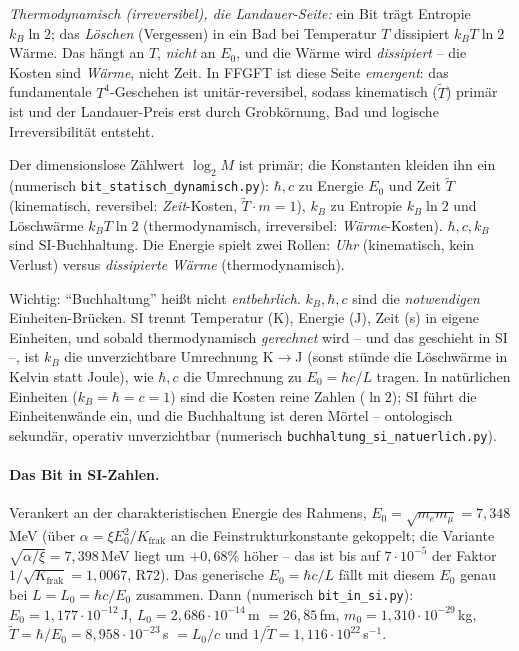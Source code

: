 \emph{Thermodynamisch (irreversibel), die Landauer-Seite:} ein Bit trägt Entropie $k_B\ln 2$; das
\emph{Löschen} (Vergessen) in ein Bad bei Temperatur $T$ dissipiert $k_B T\ln 2$ Wärme. Das hängt an $T$,
\emph{nicht} an $E_0$, und die Wärme wird \emph{dissipiert} -- die Kosten sind \emph{Wärme}, nicht Zeit.
In FFGFT ist diese Seite \emph{emergent}: das fundamentale $T^4$-Geschehen ist unitär-reversibel, sodass
kinematisch ($\tilde T$) primär ist und der Landauer-Preis erst durch Grobkörnung, Bad und logische
Irreversibilität entsteht.

Der dimensionslose Zählwert $\log_2 M$ ist primär; die Konstanten kleiden ihn ein (numerisch
\texttt{bit\_statisch\_dynamisch.py}): $\hbar,c$ zu Energie $E_0$ und Zeit $\tilde T$ (kinematisch,
reversibel: \emph{Zeit}-Kosten, $\tilde T\cdot m=1$), $k_B$ zu Entropie $k_B\ln 2$ und Löschwärme
$k_B T\ln 2$ (thermodynamisch, irreversibel: \emph{Wärme}-Kosten). $\hbar,c,k_B$ sind SI-Buchhaltung.
Die Energie spielt zwei Rollen: \emph{Uhr} (kinematisch, kein Verlust) versus \emph{dissipierte Wärme}
(thermodynamisch).

Wichtig: \enquote{Buchhaltung} heißt nicht \emph{entbehrlich}. $k_B,\hbar,c$ sind die \emph{notwendigen}
Einheiten-Brücken. SI trennt Temperatur (K), Energie (J), Zeit (s) in eigene Einheiten, und sobald
thermodynamisch \emph{gerechnet} wird -- und das geschieht in SI --, ist $k_B$ die unverzichtbare
Umrechnung K$\to$J (sonst stünde die Löschwärme in Kelvin statt Joule), wie $\hbar,c$ die Umrechnung zu
$E_0=\hbar c/L$ tragen. In natürlichen Einheiten ($k_B=\hbar=c=1$) sind die Kosten reine Zahlen ($\ln 2$);
SI führt die Einheitenwände ein, und die Buchhaltung ist deren Mörtel -- ontologisch sekundär, operativ
unverzichtbar (numerisch \texttt{buchhaltung\_si\_natuerlich.py}).

\paragraph{Das Bit in SI-Zahlen.} Verankert an der charakteristischen Energie des Rahmens,
$E_0=\sqrt{m_e m_\mu}=7{,}348$\,MeV (über $\alpha=\xi E_0^2/K_{\text{frak}}$ an die Feinstrukturkonstante gekoppelt; die
Variante $\sqrt{\alpha/\xi}=7{,}398$\,MeV liegt um $+0{,}68\%$ höher -- das ist bis auf $7\cdot10^{-5}$ der Faktor $1/\sqrt{K_{\text{frak}}} = 1{,}0067$, R72). Das
generische $E_0=\hbar c/L$ fällt mit diesem $E_0$ genau bei $L=L_0=\hbar c/E_0$ zusammen. Dann (numerisch
\texttt{bit\_in\_si.py}): $E_0=1{,}177\cdot10^{-12}$\,J, $L_0=2{,}686\cdot10^{-14}$\,m $=26{,}85$\,fm,
$m_0=1{,}310\cdot10^{-29}$\,kg, $\tilde T=\hbar/E_0=8{,}958\cdot10^{-23}$\,s $=L_0/c$ und
$1/\tilde T=1{,}116\cdot10^{22}$\,s$^{-1}$.

